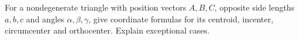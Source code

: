 For a nondegenerate triangle with position vectors $A,B,C$, opposite side lengths $a,b,c$ and angles $\alpha,\beta,\gamma$, give coordinate formulas for its centroid, incenter, circumcenter and orthocenter. Explain exceptional cases.
